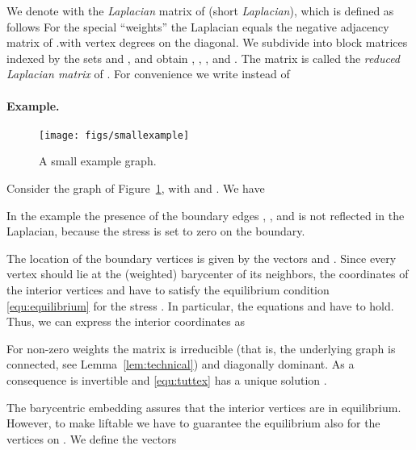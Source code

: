 \documentclass{article}
\theoremstyle{plain} \newtheorem{thm}{Theorem}[section]
\begin{document}
We denote with  the \emph{Laplacian} matrix of  (short \emph{Laplacian}), which is defined as follows
For the special ``weights''  the Laplacian equals the
negative adjacency matrix of .with vertex degrees on the diagonal.
We subdivide  into block
matrices indexed by the  sets  and , and obtain , , , and .
The matrix  is called the \textit{reduced Laplacian matrix}  of . For convenience we write  instead of 
\paragraph{Example.}
  \begin{figure}
    \centering
    \texttt{[image: figs/smallexample]}
    \caption{A small example graph.}
    \label{fig:smallexample}
  \end{figure}
Consider the graph of Figure~\ref{fig:smallexample},
with  and . We have

\iffalse MAPLE CODE
with(linalg):
LBB := matrix([
[   2,0,0],
[   0,2,0],
[   0,0,2]]);
LBI := matrix([
[ -1,-1,0,0],
[  0,-1,0,-1],
[  0, 0,-1,-1]]);
LII := matrix([
[   3,-1,-1,0],
[  -1, 4,0,-1],
[  -1, 0,3,-1],
[  0,-1,-1,4]]);
Ls := evalm( LBB - LBI &* inverse(LII) &* transpose(LBI));
       [ 96             -39 ]
       [ --     -3/5    --- ]
       [ 95             95  ]
       [                    ]
       [-3/5    6/5     -3/5]
       [                    ]
       [-39              96 ]
       [---     -3/5     -- ]
       [95               95 ]
\fi
In the example the presence of the boundary edges , ,
and  is not reflected in the Laplacian, because the stress is set to zero on the boundary.

The location of the boundary vertices is given by the vectors 
 and  .
Since every vertex should lie at the (weighted) barycenter of its neighbors, the coordinates of the interior vertices    and
   have to satisfy the  equilibrium condition
\eqref{equ:equilibrium} for the stress . In particular, 
the equations  and   have to hold. 
Thus, we can express the interior coordinates as

For non-zero weights  the matrix  is irreducible (that is, the underlying graph is connected, see Lemma~\ref{lem:technical}) and diagonally dominant. As a consequence  is invertible and \eqref{equ:tuttex} has a unique solution \cite[page 363]{hj-ma-90}.

The barycentric embedding assures that the interior vertices are in equilibrium. However, to make  liftable we have to guarantee the equilibrium also for the vertices on . 
We define the vectors
\end{document}
